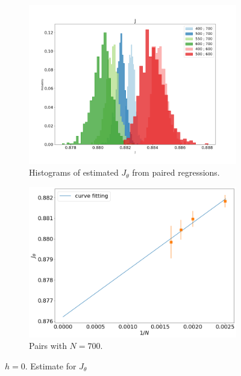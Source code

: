   \begin{figure}
	\centering
	\captionsetup{justification=centering}
	\begin{subfigure}[b]{0.45\textwidth}
		\includegraphics[width=\textwidth]{Images/radius_hist_cov_3D.png}
		\caption{ Histograms of estimated $J_{\theta}$ from paired regressions.    } 
		\label{fig:Jthetahistogram_3D}
	\end{subfigure}
	\begin{subfigure}[b]{0.45\textwidth}
		\includegraphics[width=\textwidth]{Images/criticalr2_3D.png}
		\caption{  Pairs with $N=700$. }
		\label{fig:JthetaLinear_3D}
	\end{subfigure}
	\caption{$h=0$. Estimate for $J_{\theta}$  }
	\label{fig:ThetaEsrimation_3D}
\end{figure}


